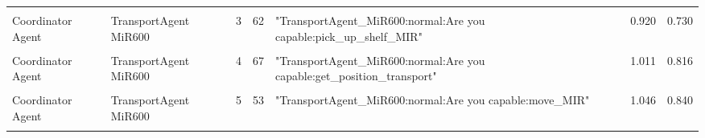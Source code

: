 \begin{table}[htbp]
\begin{tabular}{m{} m{} m{} m{} m{} m{} m{}}
    & & & & & &\\
    Coordinator Agent & TransportAgent MiR600 & 3  & 62  & "TransportAgent\_MiR600:normal:Are you capable:pick\_up\_shelf\_MIR"                                                                                                                                                                                                                                                                                                                                                                                                                                                                                                                                                                                                                     & 0.920 & 0.730 \\ 
    & & & & & &\\
    Coordinator Agent & TransportAgent MiR600 & 4  & 67  & "TransportAgent\_MiR600:normal:Are you capable:get\_position\_transport"                                                                                                                                                                                                                                                                                                                                                                                                                                                                                                                                                                                                                 & 1.011 & 0.816 \\ 
    & & & & & &\\
    Coordinator Agent & TransportAgent MiR600 & 5  & 53  & "TransportAgent\_MiR600:normal:Are you capable:move\_MIR"                                                                                                                                                                                                                                                                                                                                                                                                                                                                                                                                                                                                                                & 1.046 & 0.840 \\ 
    & & & & & &\\

\end{tabular}
\end{table}
